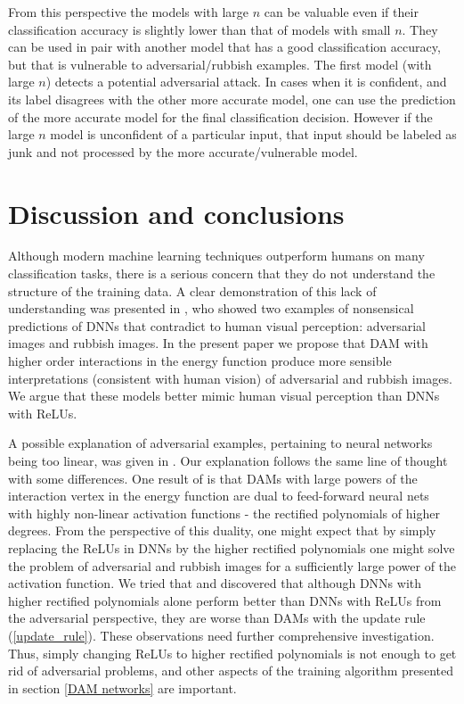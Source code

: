 From this perspective the models with large $n$ can be valuable even if their classification accuracy is slightly lower than that of models with small $n$. They can be used in pair with another model that has a good classification accuracy, but that is vulnerable to adversarial/rubbish examples. The first model (with large $n$) detects a potential adversarial attack. In cases when it is confident, and its label disagrees with the other more accurate model, one can use the prediction of the more accurate model for the final classification decision. However if the large $n$ model is unconfident of a particular input, that input should be labeled as junk and not processed by the more accurate/vulnerable model. 

\section{Discussion and conclusions} Although modern machine learning techniques outperform humans on many classification tasks, there is a serious concern that they do not understand the structure of the training data. A clear demonstration of this lack of understanding was presented in \cite{Szegedy,Nguyen}, who showed two examples of nonsensical predictions of DNNs that contradict to human visual perception: adversarial images and rubbish images. In the present paper we propose that DAM with higher order interactions in the energy function produce more sensible interpretations (consistent with human vision) of adversarial and rubbish images. We argue that these models better mimic human visual perception than DNNs with ReLUs. 

A possible explanation of adversarial examples, pertaining to neural networks being too linear, was given in \cite{sign gradient}. Our explanation follows the same line of thought with some differences. One result of \cite{Krotov Hopfield} is that DAMs with large powers of the interaction vertex in the energy function are dual to feed-forward neural nets with highly non-linear activation functions - the rectified polynomials of higher degrees. From the perspective of this duality, one might expect that by simply replacing the ReLUs in DNNs by the higher rectified polynomials one might solve the problem of adversarial and rubbish images for a sufficiently large power of the activation function. We tried that and discovered that although DNNs with higher rectified polynomials alone perform better than DNNs with ReLUs from the adversarial perspective, they are worse than DAMs with the update rule (\ref{update_rule}). These observations need further comprehensive investigation. Thus, simply changing ReLUs to higher rectified polynomials is not enough to get rid of adversarial problems, and other aspects of the training algorithm presented in section \ref{DAM networks} are important. 


